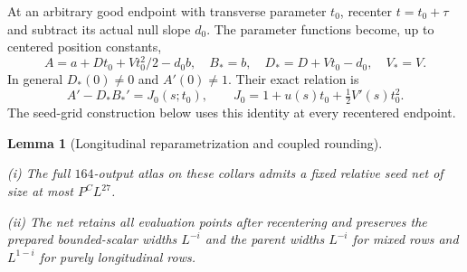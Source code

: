 \documentclass[11pt]{amsart}
\newtheorem{lemma}[theorem]{Lemma}
\theoremstyle{definition}
\theoremstyle{remark}
\numberwithin{equation}{section}
\begin{document}
At an arbitrary good endpoint with transverse parameter $t_0$, recenter $t=t_0+\tau$ and subtract its actual null slope $d_0$. The parameter functions become, up to centered position constants,
\[
A=a+Dt_0+Vt_0^2/2-d_0b,\quad B_*=b,\quad D_*=D+Vt_0-d_0,\quad V_*=V.
\]
In general $D_*(0)\ne0$ and $A'(0)\ne1$. Their exact relation is
\begin{equation}\label{low:78:d8q:off-seed}
A'-D_*B_*'=J_0(s;t_0),\qquad J_0=1+u(s)t_0+\tfrac12V'(s)t_0^2.
\end{equation}
The seed-grid construction below uses this identity at every recentered endpoint.

\begin{lemma}[Longitudinal reparametrization and coupled rounding]\label{low:78:d8q:coupled-net}

\noindent\textup{(i)} The full $164$-output atlas on these collars admits a fixed relative seed net of size at most $P^CL^{27}$.

\noindent\textup{(ii)} The net retains all evaluation points after recentering and preserves the prepared bounded-scalar widths $L^{-i}$ and the parent widths $L^{-i}$ for mixed rows and $L^{1-i}$ for purely longitudinal rows. 
\end{lemma}
\end{document}
